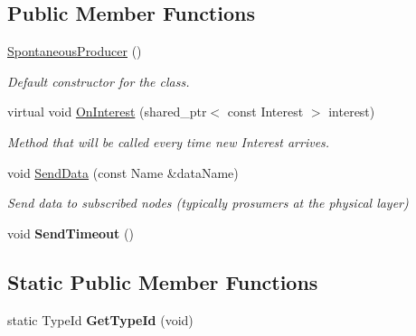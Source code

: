 \subsection*{Public Member Functions}
\begin{DoxyCompactItemize}
\item 
\hyperlink{classns3_1_1ndn_1_1SpontaneousProducer_aa2dc345680754e9732858c71538b3abc}{Spontaneous\+Producer} ()\hypertarget{classns3_1_1ndn_1_1SpontaneousProducer_aa2dc345680754e9732858c71538b3abc}{}\label{classns3_1_1ndn_1_1SpontaneousProducer_aa2dc345680754e9732858c71538b3abc}

\begin{DoxyCompactList}\small\item\em Default constructor for the class. \end{DoxyCompactList}\item 
virtual void \hyperlink{classns3_1_1ndn_1_1SpontaneousProducer_a602d1c44a34c565b9f428bb5c25add4f}{On\+Interest} (shared\+\_\+ptr$<$ const Interest $>$ interest)
\begin{DoxyCompactList}\small\item\em Method that will be called every time new Interest arrives. \end{DoxyCompactList}\item 
void \hyperlink{classns3_1_1ndn_1_1SpontaneousProducer_a668ac607529bc65ac75aaf7fb17932ea}{Send\+Data} (const Name \&data\+Name)\hypertarget{classns3_1_1ndn_1_1SpontaneousProducer_a668ac607529bc65ac75aaf7fb17932ea}{}\label{classns3_1_1ndn_1_1SpontaneousProducer_a668ac607529bc65ac75aaf7fb17932ea}

\begin{DoxyCompactList}\small\item\em Send data to subscribed nodes (typically prosumers at the physical layer) \end{DoxyCompactList}\item 
void {\bfseries Send\+Timeout} ()\hypertarget{classns3_1_1ndn_1_1SpontaneousProducer_a4d80deeb9820e921b45a93f11184e991}{}\label{classns3_1_1ndn_1_1SpontaneousProducer_a4d80deeb9820e921b45a93f11184e991}

\end{DoxyCompactItemize}
\subsection*{Static Public Member Functions}
\begin{DoxyCompactItemize}
\item 
static Type\+Id {\bfseries Get\+Type\+Id} (void)\hypertarget{classns3_1_1ndn_1_1SpontaneousProducer_a0bebd2ac3108706a2dbd71da64d43f10}{}\label{classns3_1_1ndn_1_1SpontaneousProducer_a0bebd2ac3108706a2dbd71da64d43f10}

\end{DoxyCompactItemize}
